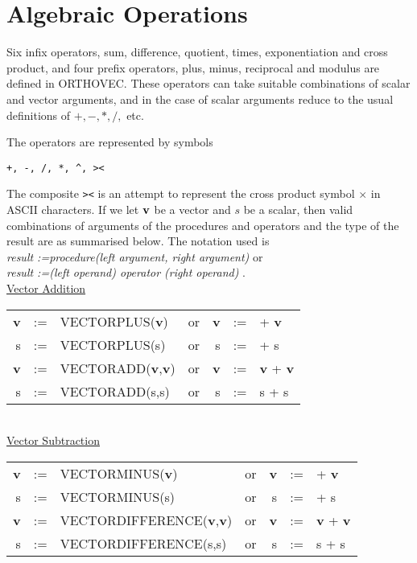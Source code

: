 \section{Algebraic Operations}

Six infix operators, sum, difference, quotient, times, exponentiation
and cross product, and four prefix
operators, plus, minus, reciprocal
and  modulus are defined in ORTHOVEC.  These operators can take suitable
combinations of scalar and vector arguments,
and in the case of scalar arguments reduce to the usual definitions of
$ +, -, *, /, $ etc.

The operators are represented by symbols 
  
  
\begin{verbatim}  
+, -, /, *, ^, ><
\end{verbatim}

 The composite {\tt ><} is an
attempt to represent the cross product symbol 
$\times$ in ASCII characters.
If we let ${\bf v}$ be a vector and $s$ be a scalar, then
valid combinations of arguments of the 
procedures and operators and the type of the result 
are as summarised below.  The notation used is\\
{\em result :=procedure(left argument, right argument) } or\\
{\em result :=(left operand) operator (right operand) } . \\

\newpage
\underline{Vector Addition} \\
  
\begin{tabular}{rclcrcl}
{\bf v} &:=& VECTORPLUS({\bf v})  &{\rm or}& {\bf v} &:=&  +  {\bf v} \\
     s  &:=& VECTORPLUS(s)  &{\rm or} &      s  &:=&  +       s  \\
{\bf v} &:=& VECTORADD({\bf v},{\bf v})  &{\rm or }& {\bf v} &:=&  
{\bf v} +  {\bf v} \\
     s  &:=& VECTORADD(s,s)  &{\rm or }&      s  &:=&  s + s \\
\end{tabular} \\

\underline{Vector Subtraction} \\
  
\begin{tabular}{rclcrcl}
{\bf v} &:=& VECTORMINUS({\bf v})  &{\rm or}&
 {\bf v} &:=&  +  {\bf v} \\
 s  &:=& VECTORMINUS(s)  &{\rm or} &      s  &:=&  +       s  \\
{\bf v} &:=& VECTORDIFFERENCE({\bf v},{\bf v})  &{\rm or }& {\bf v} &:=&
  {\bf v} +  {\bf v} \\
 s  &:=& VECTORDIFFERENCE(s,s)  &{\rm or }&      s  &:=&  s + s \\
\end{tabular} \\

